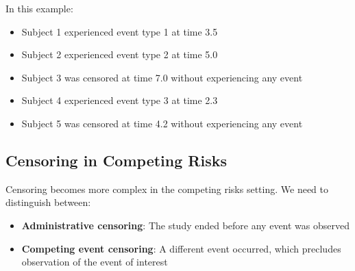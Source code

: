In this example:
\begin{itemize}
    \item Subject 1 experienced event type 1 at time 3.5
    \item Subject 2 experienced event type 2 at time 5.0
    \item Subject 3 was censored at time 7.0 without experiencing any event
    \item Subject 4 experienced event type 3 at time 2.3
    \item Subject 5 was censored at time 4.2 without experiencing any event
\end{itemize}

\subsection{Censoring in Competing Risks}

Censoring becomes more complex in the competing risks setting. We need to distinguish between:

\begin{itemize}
    \item \textbf{Administrative censoring}: The study ended before any event was observed
    \item \textbf{Competing event censoring}: A different event occurred, which precludes observation of the event of interest
\end{itemize}

